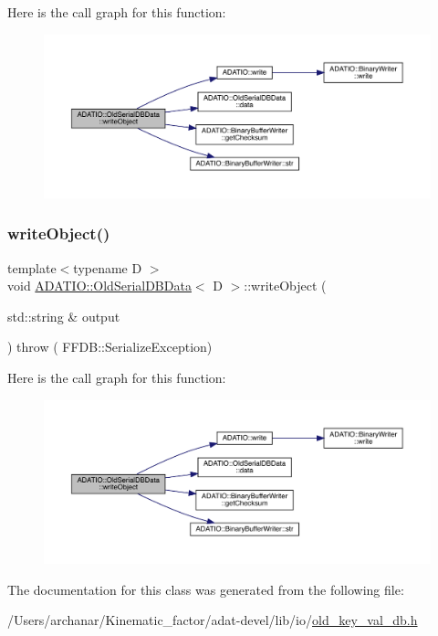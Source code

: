 Here is the call graph for this function\+:
\nopagebreak
\begin{figure}[H]
\begin{center}
\leavevmode
\includegraphics[width=350pt]{da/dbc/classADATIO_1_1OldSerialDBData_aec52af4bfb6beb74fc039b9b25328270_cgraph}
\end{center}
\end{figure}
\mbox{\label{classADATIO_1_1OldSerialDBData_aec52af4bfb6beb74fc039b9b25328270}} 
\subsubsection{\texorpdfstring{writeObject()}{writeObject()}\hspace{0.1cm}{\footnotesize\ttfamily [3/3]}}
{\footnotesize\ttfamily template$<$typename D $>$ \\
void \mbox{\hyperlink{classADATIO_1_1OldSerialDBData}{A\+D\+A\+T\+I\+O\+::\+Old\+Serial\+D\+B\+Data}}$<$ D $>$\+::write\+Object (\begin{DoxyParamCaption}\item[{std\+::string \&}]{output }\end{DoxyParamCaption}) throw ( F\+F\+D\+B\+::\+Serialize\+Exception) \hspace{0.3cm}{\ttfamily [inline]}}

Here is the call graph for this function\+:
\nopagebreak
\begin{figure}[H]
\begin{center}
\leavevmode
\includegraphics[width=350pt]{da/dbc/classADATIO_1_1OldSerialDBData_aec52af4bfb6beb74fc039b9b25328270_cgraph}
\end{center}
\end{figure}


The documentation for this class was generated from the following file\+:\begin{DoxyCompactItemize}
\item 
/\+Users/archanar/\+Kinematic\+\_\+factor/adat-\/devel/lib/io/\mbox{\hyperlink{adat-devel_2lib_2io_2old__key__val__db_8h}{old\+\_\+key\+\_\+val\+\_\+db.\+h}}\end{DoxyCompactItemize}
